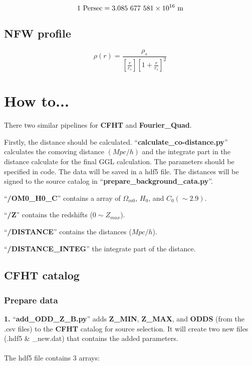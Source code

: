 \documentclass[12pt, a4paper]{article}
\begin{document}
\begin{equation}
1 \ \rm{Persec} =  3.085\  677\  581 \times 10^{16} \ \rm{m}
\end{equation}



\subsection{NFW profile}
\begin{equation}
\rho(r)= \frac{\rho_s}{[\frac{r}{r_s}][1+\frac{r}{r_s}]^2}
\end{equation}
\section{How to...}
There two similar pipelines for \textbf{CFHT} and \textbf{Fourier\_Quad}.

Firstly, the distance should be calculated. ``\textbf{calculate\_co-distance.py}'' calculates the comoving distance $(Mpc/h)$ and the integrate part in the distance calculate for the final GGL calculation. 
The parameters should be specified in code. The data will be saved in a hdf5 file. The distances will be signed to the source catalog in ``\textbf{prepare\_background\_cata.py}''.

\noindent``\textbf{/OM0\_H0\_C}'' contains a array of $\Omega_{m0}$, $H_0$, and $C_0(\sim 2.9)$.

\noindent``\textbf{/Z}'' contains the redshifts ($0 \sim Z_{max}$).

\noindent``\textbf{/DISTANCE}'' contains the distances ($Mpc/h$).

\noindent``\textbf{/DISTANCE\_INTEG}'' the integrate part of the distance.

\subsection{CFHT catalog}

\subsubsection{Prepare data}
\textbf{1.} ``\textbf{add\_ODD\_Z\_B.py}'' adds \textbf{Z\_MIN}, \textbf{Z\_MAX}, and \textbf{ODDS} (from the .csv files) to the \textbf{CFHT} catalog for source selection.
It will create two new files (.hdf5 \& \_new.dat) that contains the added parameters.
\\ \hspace*{\fill} \\
\noindent The hdf5 file contains 3 arrays:
\end{document}

